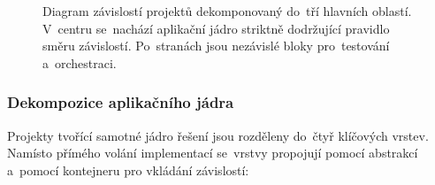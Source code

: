 \documentclass[
  master,
  program=ainfvs,
  printversion,
  figures=false,
  tables=false,
  glossaries,
  index
]{kidiplom}
\begin{document}
\begin{figure}[H]
{%
    }
    \shorthandon{-}
    \caption{Diagram závislostí projektů dekomponovaný do~tří hlavních oblastí. V~centru se~nachází aplikační jádro striktně dodržující pravidlo směru závislostí. Po~stranách jsou nezávislé bloky pro~testování a~orchestraci.}
    \label{fig:clean_arch}
\end{figure}

\subsubsection{Dekompozice aplikačního jádra}
Projekty tvořící samotné jádro řešení jsou rozděleny do~čtyř klíčových vrstev. Namísto přímého volání implementací se~vrstvy propojují pomocí abstrakcí a~pomocí kontejneru pro vkládání závislostí:
\end{document}
